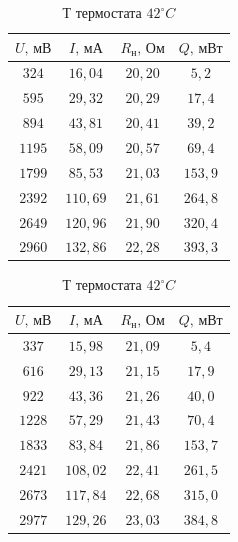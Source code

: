 \documentclass[a4paper,12pt]{article}
\begin{document}
         \begin{table}[!ht]
    \begin{minipage}{0.48\linewidth}
        \centering
        \begin{tabular}{|c|c|c|c|}
            \hline
            $U, \, \text{мВ}$ & $I, \, \text{мА}$ & $R_н, \, \text{Ом}$ & $Q, \, \text{мВт}$\\ \hline
            $ 324$ &  $16,04 $  &    $20,20$  &  $  5,2$ \\ \hline
            $ 595$ &  $29,32 $  &    $20,29$  &  $ 17,4$ \\ \hline
            $ 894$ &  $43,81 $  &    $20,41$  &  $ 39,2$ \\ \hline
            $1195$ &  $ 58,09$  &    $20,57$  &  $ 69,4$ \\ \hline
            $1799$ &  $ 85,53$  &    $21,03$  &  $153,9$ \\ \hline
            $2392$ &  $110,69$  &    $21,61$  &  $264,8$ \\ \hline
            $2649$ &  $120,96$  &    $21,90$  &  $320,4$ \\ \hline
            $2960$ &  $132,86$  &    $22,28$  &  $393,3$ \\ \hline
        \end{tabular}
        \caption{Т термостата $30 ^\circ C$}
        \label{table_61}
    \end{minipage}
    \hspace{0.04\linewidth} %
    \begin{minipage}{0.4\linewidth}
        \centering
        \begin{tabular}{|c|c|c|c|}
            \hline
            $U, \, \text{мВ}$ & $I, \, \text{мА}$ & $R_н, \, \text{Ом}$ & $Q, \, \text{мВт}$\\ \hline
            $ 337$ &  $15,98 $   &      $21,09$  &  $  5,4$ \\ \hline
            $ 616$ &  $29,13 $   &      $21,15$  &  $ 17,9$ \\ \hline
            $ 922$ &  $43,36 $   &      $21,26$  &  $ 40,0$ \\ \hline
            $1228$ &  $ 57,29$   &      $21,43$  &  $ 70,4$ \\ \hline
            $1833$ &  $ 83,84$   &      $21,86$  &  $153,7$ \\ \hline
            $2421$ &  $108,02$   &      $22,41$  &  $261,5$ \\ \hline
            $2673$ &  $117,84$   &      $22,68$  &  $315,0$ \\ \hline
            $2977$ &  $129,26$   &      $23,03$  &  $384,8$ \\ \hline
        \end{tabular}
        \caption{Т термостата $42 ^\circ C$}
        \label{table_80}
    \end{minipage}
\end{table}
    \newpage
\end{document}
